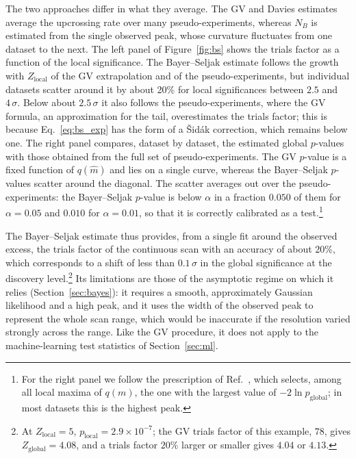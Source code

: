 The two approaches differ in what they average. The GV and Davies estimates average the upcrossing rate over many pseudo-experiments, whereas $N_B$ is estimated from the single observed peak, whose curvature fluctuates from one dataset to the next. The left panel of Figure~\ref{fig:bs} shows the trials factor as a function of the local significance. The Bayer--Seljak estimate follows the growth with $Z_\text{local}$ of the GV extrapolation and of the pseudo-experiments, but individual datasets scatter around it by about 20\% for local significances between $2.5$ and $4\,\sigma$. Below about $2.5\,\sigma$ it also follows the pseudo-experiments, where the GV formula, an approximation for the tail, overestimates the trials factor; this is because Eq.~\eqref{eq:bs_exp} has the form of a \v{S}id\'ak correction, which remains below one. The right panel compares, dataset by dataset, the estimated global $p$-values with those obtained from the full set of pseudo-experiments. The GV $p$-value is a fixed function of $q(\hat m)$ and lies on a single curve, whereas the Bayer--Seljak $p$-values scatter around the diagonal. The scatter averages out over the pseudo-experiments: the Bayer--Seljak $p$-value is below $\alpha$ in a fraction $0.050$ of them for $\alpha=0.05$ and $0.010$ for $\alpha=0.01$, so that it is correctly calibrated as a test.\footnote{For the right panel we follow the prescription of Ref.~\cite{Bayer:2020pva}, which selects, among all local maxima of $q(m)$, the one with the largest value of $-2\ln p_\text{global}$; in most datasets this is the highest peak.}

The Bayer--Seljak estimate thus provides, from a single fit around the observed excess, the trials factor of the continuous scan with an accuracy of about 20\%, which corresponds to a shift of less than $0.1\,\sigma$ in the global significance at the discovery level.\footnote{At $Z_\text{local}=5$, $p_\text{local}=2.9\times10^{-7}$; the GV trials factor of this example, $78$, gives $Z_\text{global}=4.08$, and a trials factor $20\%$ larger or smaller gives $4.04$ or $4.13$.} Its limitations are those of the asymptotic regime on which it relies (Section~\ref{sec:bayes}): it requires a smooth, approximately Gaussian likelihood and a high peak, and it uses the width of the observed peak to represent the whole scan range, which would be inaccurate if the resolution varied strongly across the range. Like the GV procedure, it does not apply to the machine-learning test statistics of Section~\ref{sec:ml}.

